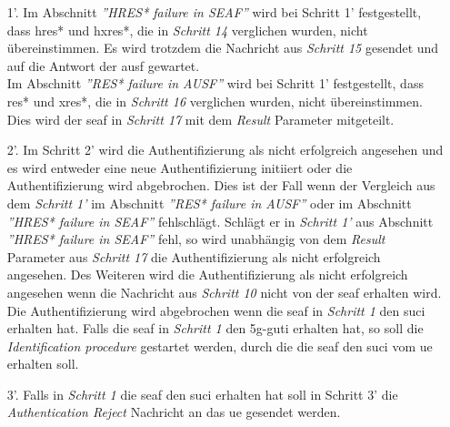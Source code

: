 \begin{enumerate}
\item[1'.] Im Abschnitt \textit{''HRES* failure in SEAF''} wird bei Schritt 1' festgestellt, dass \gls{hres*} und \gls{hxres*}, die in \textit{Schritt 14} verglichen wurden, nicht übereinstimmen. 
Es wird trotzdem die Nachricht aus \textit{Schritt 15} gesendet und auf die Antwort der \gls{ausf} gewartet. \\
Im Abschnitt \textit{''RES* failure in AUSF''} wird bei Schritt 1' festgestellt, dass \gls{res*} und \gls{xres*}, die in \textit{Schritt 16} verglichen wurden, nicht übereinstimmen.
Dies wird der \gls{seaf} in \textit{Schritt 17} mit dem \textit{Result} Parameter mitgeteilt.

\item[2'.] Im Schritt 2' wird die Authentifizierung als nicht erfolgreich angesehen und es wird entweder eine neue Authentifizierung initiiert oder die Authentifizierung wird abgebrochen.
Dies ist der Fall wenn der Vergleich aus dem \textit{Schritt 1'} im Abschnitt \textit{''RES* failure in AUSF''} oder im Abschnitt \textit{''HRES* failure in SEAF''} fehlschlägt.
Schlägt er in \textit{Schritt 1'} aus Abschnitt \textit{''HRES* failure in SEAF''} fehl, so wird unabhängig von dem \textit{Result} Parameter aus \textit{Schritt 17} die Authentifizierung als nicht erfolgreich angesehen.
Des Weiteren wird die Authentifizierung als nicht erfolgreich angesehen wenn die Nachricht aus \textit{Schritt 10} nicht von der \gls{seaf} erhalten wird.
Die Authentifizierung wird abgebrochen wenn die \gls{seaf} in \textit{Schritt 1} den \gls{suci} erhalten hat.
Falls die \gls{seaf} in \textit{Schritt 1} den \gls{5g-guti} erhalten hat, so soll die \textit{Identification procedure} gestartet werden, durch die die \gls{seaf} den \gls{suci} vom \gls{ue} erhalten soll.

\item[3'.] Falls in \textit{Schritt 1} die \gls{seaf} den \gls{suci} erhalten hat soll in Schritt 3' die \textit{Authentication Reject} Nachricht an das \gls{ue} gesendet werden.
\end{enumerate}














